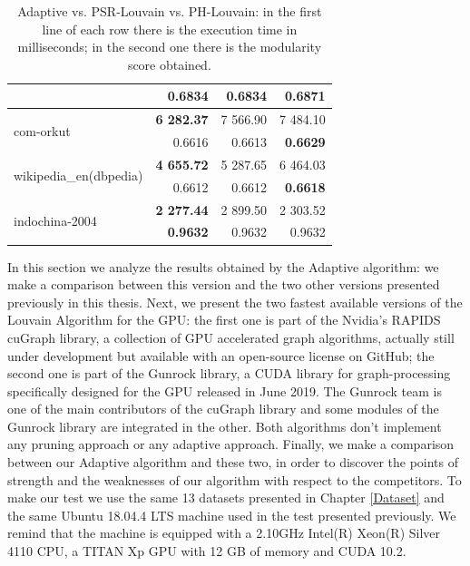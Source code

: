 \begin{table}[t!]
\begin{tabular}{ |l||r||r|r|}
													& 0.6834	& 0.6834 	& \textbf{0.6871} \\\hline
		\multirow{ 2}{*}{com-orkut }				& \textbf{6 282.37}	& 7 566.90 	& 7 484.10 \\
													& 0.6616	& 0.6613 	& \textbf{0.6629} \\\hline
		\multirow{ 2}{*}{wikipedia\_en(dbpedia)}	& \textbf{4 655.72}	& 5 287.65 	& 6 464.03 \\
													& 0.6612 	& 0.6612 	& \textbf{0.6618} \\\hline
		\multirow{ 2}{*}{indochina-2004}			&\textbf{ 2 277.44 }	& 2 899.50 	& 2 303.52 \\
													& \textbf{0.9632}	& 0.9632 	& 0.9632 \\\hline
	\end{tabular}
	\caption{\label{tab:adaptive} Adaptive vs. PSR-Louvain vs. PH-Louvain: in the first line of each row there is the execution time in milliseconds; in the second one there is the modularity score obtained. }
\end{table} 
\noindent In this section we analyze the results obtained by the Adaptive algorithm: we make a comparison between this version and the two other versions presented previously in this thesis. Next, we present the two fastest available versions of the Louvain Algorithm for the GPU: the first one is part of the Nvidia's RAPIDS cuGraph library,  a collection of GPU accelerated graph algorithms, actually still under development but available with an open-source license on GitHub; the second one is part of the Gunrock library, a CUDA  library for graph-processing specifically designed for the GPU released in June 2019. The Gunrock team is one of the main contributors of the cuGraph library and some modules of the Gunrock library are integrated in the other. Both algorithms don't implement any pruning approach or any adaptive approach. Finally, we make a comparison between our Adaptive algorithm and these two, in order to discover the points of strength and the weaknesses of our algorithm with respect to the competitors. 
To make our test we use the same 13 datasets presented in Chapter \ref{Dataset} and the same Ubuntu 18.04.4 LTS machine used in the test presented previously. We remind that the machine is equipped with a 2.10GHz Intel(R) Xeon(R) Silver 4110 CPU, a TITAN Xp GPU with 12 GB of memory and CUDA 10.2.
